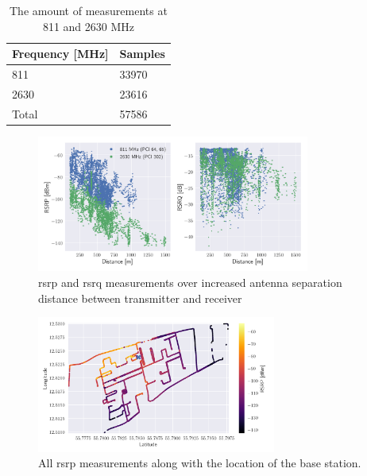 \begin{table}[]
\centering
\begin{tabular}{@{}ll@{}}
\toprule
Frequency {[}MHz{]} & Samples                      \\ \midrule
811                 & 33970                        \\
2630                & 23616                        \\ \midrule
Total               & 57586      \\ \bottomrule
\end{tabular}
\caption{The amount of measurements at 811 and 2630 MHz}\label{tab:drive_test_2017}
\end{table}


\begin{figure}
    \centering
    \includegraphics[width=0.8\textwidth]{appendix/figures/drive_test_2017_811_2630_example.png}
    \caption{\gls{rsrp} and \gls{rsrq} measurements over increased antenna separation distance between transmitter and receiver}
    \label{fig:drive_test_2017_example}
\end{figure}

\begin{figure}
    \centering
    \includegraphics[width=0.7\textwidth]{appendix/figures/drivetest_2017_scatter.png}
    \caption{All \gls{rsrp} measurements along with the location of the base station.}
    \label{fig:drivetest_area}
\end{figure}


